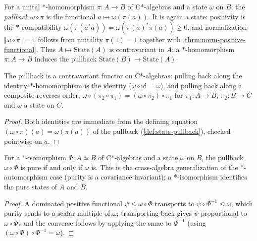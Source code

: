 \begin{definition}
    \label{def:state-pullback}
    \leanok
    For a unital $*$-homomorphism $\pi : A \to B$ of C*-algebras and a state $\omega$ on $B$, the \emph{pullback} $\omega \circ \pi$ is the functional $a \mapsto \omega(\pi(a))$. It is again a state: positivity is the $*$-compatibility $\omega(\pi(a^* a)) = \omega(\pi(a)^*\pi(a)) \ge 0$, and normalization $\Vert\omega\circ\pi\Vert = 1$ follows from unitality $\pi(1) = 1$ together with \ref{thrm:norm-positive-functional}. Thus $A \mapsto \mathrm{State}(A)$ is contravariant in $A$: a $*$-homomorphism $\pi : A \to B$ induces the pullback $\mathrm{State}(B) \to \mathrm{State}(A)$.
\end{definition}

\begin{theorem}
    \label{thrm:state-pullback-functorial}
    \leanok
    The pullback is a contravariant functor on C*-algebras: pulling back along the identity $*$-homomorphism is the identity ($\omega \circ \mathrm{id} = \omega$), and pulling back along a composite reverses order, $\omega \circ (\pi_2 \circ \pi_1) = (\omega \circ \pi_2) \circ \pi_1$ for $\pi_1 : A \to B$, $\pi_2 : B \to C$ and $\omega$ a state on $C$.
\end{theorem}
\begin{proof}
    \leanok
    Both identities are immediate from the defining equation $(\omega \circ \pi)(a) = \omega(\pi(a))$ of the pullback (\ref{def:state-pullback}), checked pointwise on $a$.
\end{proof}

\begin{theorem}
    \label{thrm:pure-pullback-invariant}
    \leanok
    For a $*$-isomorphism $\Phi : A \simeq B$ of C*-algebras and a state $\omega$ on $B$, the pullback $\omega \circ \Phi$ is pure if and only if $\omega$ is. This is the cross-algebra generalization of the $*$-automorphism case (purity is a covariance invariant); a $*$-isomorphism identifies the pure states of $A$ and $B$.
\end{theorem}
\begin{proof}
    \leanok
    A dominated positive functional $\psi \le \omega \circ \Phi$ transports to $\psi \circ \Phi^{-1} \le \omega$, which purity sends to a scalar multiple of $\omega$; transporting back gives $\psi$ proportional to $\omega \circ \Phi$, and the converse follows by applying the same to $\Phi^{-1}$ (using $(\omega \circ \Phi)\circ \Phi^{-1} = \omega$).
\end{proof}

